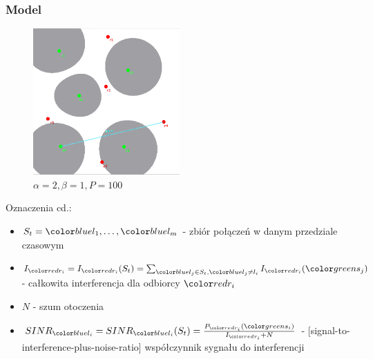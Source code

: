 \documentclass[polish, t,10pt]{beamer}
\begin{document}
    \begin{frame}
        \frametitle{Model}
        \begin{figure}
            \includegraphics[width=0.5\textwidth]{pictures/model-diagram2.png}
            \caption{$\alpha=2, \beta=1, P=100$}
        \end{figure}
        Oznaczenia cd.:
        \begin{itemize}
            \item $S_t = {\lo, \ldots, \lm}$ - zbiór połączeń w danym przedziale czasowym
            \item $I_{\ri} = I_{\ri}(S_t) = \sum_{\lj \in S_t, \lj \neq l_i} I_{\ri}(\sj)$ - całkowita interferencja dla odbiorcy $\ri$
            \item $N$ - szum otoczenia
            \item $SINR_{\li} = SINR_{\li}(S_t) = \frac{P_{\ri}(\si)}{I_{\ri} + N}$ - [signal-to-interference-plus-noise-ratio] współczynnik sygnału do interferencji
        \end{itemize}
    \end{frame}
\end{document}
